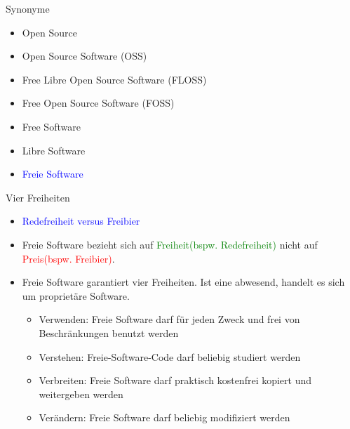 



\begin{frame}
  \titlepage
\end{frame}

\begin{frame}{Synonyme}
  \begin{itemize}
  \item<1-> Open Source
  \item<4-> Open Source Software (OSS)
  \item<4-> Free Libre Open Source Software (FLOSS)
  \item<4-> Free Open Source Software (FOSS)
  \item<2-> Free Software
  \item<3-> Libre Software
  \item<5-> \textcolor{blue}{Freie Software}
  \end{itemize}
\end{frame}

\begin{frame}{Vier Freiheiten}
\begin{itemize}
\item \textcolor{blue}{Redefreiheit versus Freibier}\pause\\
\item Freie Software bezieht sich auf \textcolor{green}{Freiheit(bspw. Redefreiheit)} nicht auf \textcolor{red}{Preis(bspw. Freibier)}.\pause\\
\item Freie Software garantiert vier Freiheiten. Ist eine abwesend, handelt es sich um proprietäre Software.
\begin{itemize}
\item Verwenden: Freie Software darf für jeden Zweck und frei von Beschränkungen benutzt werden
\item Verstehen: Freie-Software-Code darf beliebig studiert werden
\item Verbreiten: Freie Software darf praktisch kostenfrei kopiert und weitergeben werden
\item Verändern: Freie Software darf beliebig modifiziert werden
\end{itemize}
\end{itemize}
\end{frame}

